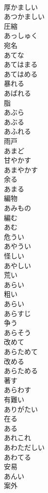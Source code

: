 \documentclass[8pt]{extreport}
\begin{document}
\begin{CJK}{UTF8}{min}
\\	厚かましい 
\\	あつかましい	
\\	圧縮 
\\	あっしゅく	
\\	宛名 
\\	あてな	
\\	あてはまる	
\\	あてはめる	
\\	暴れる 
\\	あばれる	
\\	脂 
\\	あぶら	
\\	あぶる	
\\	あふれる	
\\	雨戸 
\\	あまど	
\\	甘やかす 
\\	あまやかす	
\\	余る 
\\	あまる	
\\	編物 
\\	あみもの	
\\	編む 
\\	あむ	
\\	危うい 
\\	あやうい	
\\	怪しい 
\\	あやしい	
\\	荒い 
\\	あらい	
\\	粗い 
\\	あらい	
\\	あらすじ	
\\	争う 
\\	あらそう	
\\	改めて 
\\	あらためて	
\\	改める 
\\	あらためる	
\\	著す 
\\	あらわす	
\\	有難い 
\\	ありがたい	
\\	在る 
\\	ある	
\\	あれこれ	
\\	あわただしい	
\\	あわてる	
\\	安易 
\\	あんい	
\\	案外 

\end{CJK}
\end{document}
